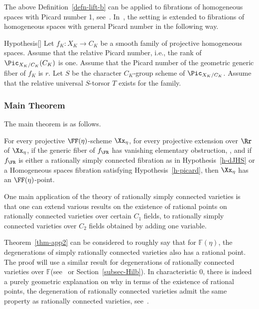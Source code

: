 The above Definition~\ref{defn-lift-b} can be applied to fibrations of homogeneous spaces with Picard number 1, see~\cite[Section~15]{dJHS}. In~\cite{Zhu}, the setting is extended to fibrations of homogeneous spaces with general Picard number in the following way.

\begin{enonce}
{Hypothesis}[{\cite[5.1]{Zhu}}]\label{h-picard}
Let $f_K \colon X_K \to C_K$ be a smooth family of projective homogeneous spaces.
Assume that the relative Picard number, i.e., the rank of $\Pic_{X_K/C_K} (C_K)$ is one. Assume that the Picard number of the geometric generic fiber of $f_K$ is $r$. Let $S$ be the character $C_K$-group scheme of $\Pic_{X_K/C_K}$. Assume that the relative universal $S$-torsor $T$ exists for the family.
\end{enonce}

\subsubsection{Main Theorem}
The main theorem is as follows.

\begin{theo}\label{thm-app2}
For every projective $\FF(\eta)$-scheme $\Xx_\eta$, for every projective extension over $\Rr$ of $\Xx_\eta$, if the generic fiber of $f_\FR$ has vanishing elementary obstruction, \cite[Section~2.2]{CTSansuc}, and if $f_\FR$ is either a rationally simply connected fibration as in Hypothesis~\ref{h-dJHS} or a Homogeneous spaces fibration satisfying Hypothesis~\ref{h-picard}, then $\Xx_\eta$ has an $\FF(\eta)$-point.
\end{theo}

\begin{rema}
One main application of the theory of rationally simply connected varieties is that one can extend various results on the existence of rational points on rationally connected varieties over certain $C_1$ fields, to rationally simply connected varieties over $C_2$ fields obtained by adding one variable.

Theorem~\ref{thm-app2} can be considered to roughly say that for $\mathbb{F}(\eta)$, the degenerations of simply rationally connected varieties also has a rational point. The proof will use a similar result for degenerations of rationally connected varieties over $\mathbb{F}$(see~\cite{Esnaultpadic, EsnaultXu} or Section~\ref{subsec-Hilb}). In characteristic 0, there is indeed a purely geometric explanation on why in terms of the existence of rational points, the degeneration of rationally connected varieties admit the same property as rationally connected varieties, see~\cite{HogadiXu}.
\end{rema}


